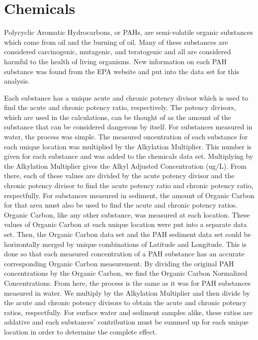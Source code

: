 \documentclass[11pt]{article}
\begin{document}
\section{Chemicals}

Polycyclic Aromatic Hydrocarbons, or PAHs, are semi-volatile organic substances which come from oil and the burning of oil.  Many of these substances are considered carcinogenic, mutagenic, and teratogenic and all are considered harmful to the health of living organisms.  New information on each PAH substance was found from the EPA website and put into the data set for this analysis.  

Each substance has a unique acute and chronic potency divisor which is used to find the acute and chronic potency ratio, respectively.  The potency divisors, which are used in the calculations, can be thought of as the amount of the substance that can be considered dangerous by itself. For substances measured in water, the process was simple.  The measured oncentration of each substance for each unique location was multiplied by the Alkylation Multiplier.  This number is given for each substance and was added to the chemicals data set.  Multiplying by the Alkylation Multiplier gives the Alkyl Adjusted Concentration (ug/L).  From there, each of these values are divided by the acute potency divisor and the chronic potency divisor to find the acute potency ratio and chronic potency ratio, respectfully.  For substances measured in sediment, the amount of Organic Carbon for that area must also be used to find the acute and chronic potency ratios. Organic Carbon, like any other substance, was measured at each location.  These values of Organic Carbon at each unique location were put into a separate data set.  Then, the Organic Carbon data set and the PAH sediment data set could be horizontally merged by unique combinations of Latitude and Longitude.  This is done so that each measured concentration of a PAH substance has an accurate corresponding Organic Carbon measurement.  By dividing the original PAH concentrations by the Organic Carbon, we find the Organic Carbon Normalized Concentrations.  From here, the process is the same as it was for PAH substances measured in water.  We multiply by the Alkylation Multiplier and then divide by the acute and chronic potency divisors to obtain the acute and chronic potency ratios, respectfully.   For surface water and sediment samples alike, these ratios are addative and each substances' contribution must be summed up for each unique location in order to determine the complete effect. 
\end{document}
